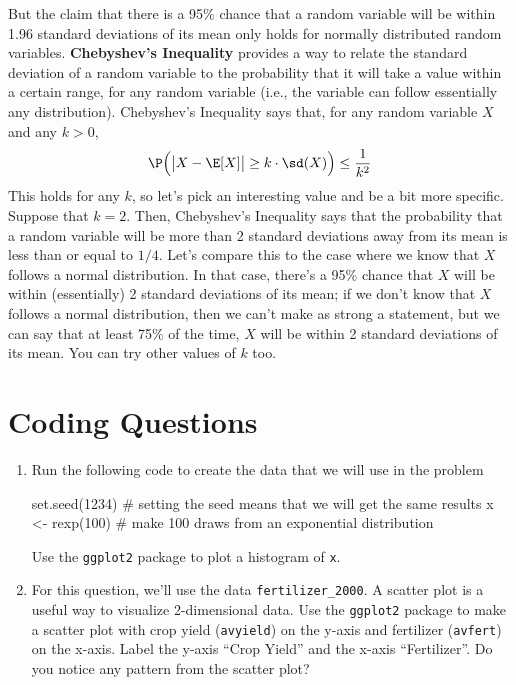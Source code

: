 \documentclass[
  letterpaper,
  DIV=11,
  numbers=noendperiod]{scrreprt}
\newenvironment{Shaded}{\begin{snugshade}}{\end{snugshade}}
\newcommand{\CommentTok}[1]{\textcolor[rgb]{0.37,0.37,0.37}{#1}}
\newcommand{\DecValTok}[1]{\textcolor[rgb]{0.68,0.00,0.00}{#1}}
\newcommand{\FunctionTok}[1]{\textcolor[rgb]{0.28,0.35,0.67}{#1}}
\newcommand{\NormalTok}[1]{\textcolor[rgb]{0.00,0.23,0.31}{#1}}
\newcommand{\OtherTok}[1]{\textcolor[rgb]{0.00,0.23,0.31}{#1}}
\begin{document}
But the claim that there is a 95\% chance that a random variable will be
within 1.96 standard deviations of its mean only holds for normally
distributed random variables. \textbf{Chebyshev's Inequality} provides a
way to relate the standard deviation of a random variable to the
probability that it will take a value within a certain range, for any
random variable (i.e., the variable can follow essentially any
distribution). Chebyshev's Inequality says that, for any random variable
\(X\) and any \(k > 0\), \begin{align*}
  \P\Big(\big|X - \E[X]\big| \geq k \cdot \sd(X) \Big) \leq \frac{1}{k^2}
\end{align*} This holds for any \(k\), so let's pick an interesting
value and be a bit more specific. Suppose that \(k=2\). Then,
Chebyshev's Inequality says that the probability that a random variable
will be more than 2 standard deviations away from its mean is less than
or equal to \(1/4\). Let's compare this to the case where we know that
\(X\) follows a normal distribution. In that case, there's a 95\% chance
that \(X\) will be within (essentially) 2 standard deviations of its
mean; if we don't know that \(X\) follows a normal distribution, then we
can't make as strong a statement, but we can say that at least 75\% of
the time, \(X\) will be within 2 standard deviations of its mean. You
can try other values of \(k\) too.

\section{Coding Questions}\label{coding-questions}

\begin{enumerate}
\def\labelenumi{\arabic{enumi}.}
\item
  Run the following code to create the data that we will use in the
  problem

\begin{Shaded}
\begin{Highlighting}[]
\FunctionTok{set.seed}\NormalTok{(}\DecValTok{1234}\NormalTok{) }\CommentTok{\# setting the seed means that we will get the same results}
\NormalTok{x }\OtherTok{\textless{}{-}} \FunctionTok{rexp}\NormalTok{(}\DecValTok{100}\NormalTok{) }\CommentTok{\# make 100 draws from an exponential distribution}
\end{Highlighting}
\end{Shaded}

  Use the \texttt{ggplot2} package to plot a histogram of \texttt{x}.
\item
  For this question, we'll use the data \texttt{fertilizer\_2000}. A
  scatter plot is a useful way to visualize 2-dimensional data. Use the
  \texttt{ggplot2} package to make a scatter plot with crop yield
  (\texttt{avyield}) on the y-axis and fertilizer (\texttt{avfert}) on
  the x-axis. Label the y-axis ``Crop Yield'' and the x-axis
  ``Fertilizer''. Do you notice any pattern from the scatter plot?
\end{enumerate}
\end{document}
